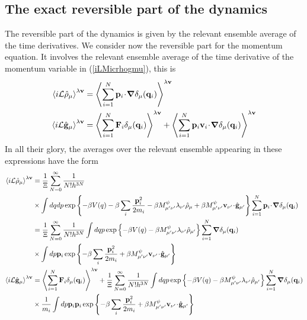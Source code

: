 \documentclass[b5paper,openright,11pt]{book}
\newcommand{\esc}{\!\cdot\!}
\newcommand{\llangle}{\left\langle}
\newcommand{\rrangle}{\right\rangle}
\begin{document}
\begin{appendices}
\section{The exact reversible part of the dynamics}
The reversible part of the dynamics  is given by the relevant ensemble
average of  the time derivatives.  We consider now the  reversible part
for the momentum equation.  It  involves the relevant ensemble average
of    the   time    derivative   of    the   momentum    variable   in
(\ref{iLMicrhogmu}), this is
\begin{align}
  \llangle i{\cal L}\hat{\rho}_\mu\rrangle^{\lambda{\bf v}} &=\llangle \sum_{i=1}^N{\bf p}_i\esc\boldsymbol{\nabla}\delta_\mu({\bf q}_i)\rrangle^{\lambda{\bf v}}
\nonumber\\
  \llangle i{\cal L}\hat{\bf g}_\mu\rrangle^{\lambda{\bf v}} &=
  \llangle \sum_{i=1}^N{\bf F}_i\delta_\mu({\bf q}_i)\rrangle^{\lambda{\bf v}}
+  \llangle \sum_{i=1}^N{\bf p}_i{\bf v}_i\esc\boldsymbol{\nabla}\delta_\mu({\bf q}_i)\rrangle^{\lambda{\bf v}}
\end{align}
In all their glory, the  averages over the relevant ensemble appearing
in these expressions have the form
\begin{align}
  \llangle i{\cal L}\hat{\rho}_\mu\rrangle^{\lambda{\bf v}} &= 
\frac{1}{\Xi} \sum_{N=0}^\infty \frac{1}{N!h^{3N}} \nonumber\\
&\times \int dq dp 
\exp\left\{-\beta V(q)-\beta \sum_i\frac{{\bf p}_i^2}{2m_i}-\beta M^\psi_{\mu'\nu'}\lambda_{\nu'}\hat{\rho}_{\mu}+\beta M^\psi_{\mu'\nu' }{\bf v}_{\nu'}\esc\hat{\bf g}_{\mu'}\right\}\sum_{i=1}^N{\bf p}_i\esc\boldsymbol{\nabla}\delta_\mu({\bf q}_i)
\nonumber\\
&= 
\frac{1}{\Xi} \sum_{N=0}^\infty \frac{1}{N!h^{3N}}\int dq p 
\exp\left\{-\beta V(q)-\beta M^\psi_{\mu'\nu'}\lambda_{\nu'} \hat{\rho}_{\mu'}\right\}\sum_{i=1}^N\boldsymbol{\nabla}\delta_\mu({\bf q}_i)
\nonumber\\
&\times \int dp{\bf p}_i\exp\left\{-\beta \sum_i\frac{{\bf p}_i^2}{2m_i}+\beta M^\psi_{\mu'\nu'}{\bf v}_{\nu'}\esc\hat{\bf g}_{\mu'}\right\}
\nonumber\\
  \llangle i{\cal L}\hat{\bf g}_\mu\rrangle^{\lambda{\bf v}} &=
  \llangle \sum_{i=1}^N{\bf F}_i\delta_\mu({\bf q}_i)\rrangle^{\lambda{\bf v}}
+\frac{1}{\Xi} \sum_{N=0}^\infty \frac{1}{N!h^{3N}}\int dq p 
\exp\left\{-\beta V(q)-\beta M^\psi_{\mu'\nu'}\lambda_{\nu'}\hat{\rho}_{\mu'}\right\}\sum_{i=1}^N\boldsymbol{\nabla}\delta_\mu({\bf q}_i)
\nonumber\\
&\times\frac{1}{m_i} \int dp{\bf p}_i{\bf p}_i\exp\left\{-\beta \sum_i\frac{{\bf p}_i^2}{2m_i}+\beta M^\psi_{\mu'\nu' }{\bf v}_{\nu'}\esc\hat{\bf g}_{\mu'}\right\}

\end{align}
\end{appendices}
\end{document}
